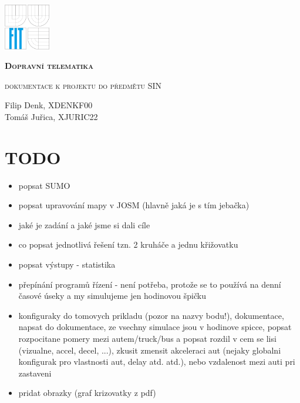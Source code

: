 \documentclass[a4paper,11pt]{article}
\begin{document}
\begin{titlepage}
	\centering
	\includegraphics[width=0.15\textwidth]{fig/fit-zp2.pdf}\par\vspace{7cm}
	{\scshape\LARGE\bfseries Dopravní telematika\par}
	\vspace{0.5cm}
	{\scshape\Large dokumentace k projektu do předmětu SIN \par}
	\vspace{1.5cm}
	{\huge\bfseries \par}
	\vspace{2cm}
	{\Large\itshape \par}
	\vspace{8cm}
	Filip Denk, XDENKF00
	\\Tomáš Juřica, XJURIC22
\end{titlepage}


\section{TODO}
\begin{itemize}
	\item popsat SUMO
	\item popsat upravování mapy v JOSM (hlavně jaká je s tím jebačka)
	\item jaké je zadání a jaké jsme si dali cíle
	\item co popsat jednotlivá řešení tzn. 2 kruháče a jednu křižovatku
	\item popsat výstupy - statistika
	\item přepínání programů řízení - není potřeba, protože se to používá na denní časové úseky a my simulujeme jen hodinovou špičku
	\item konfiguraky do tomovych prikladu (pozor na nazvy bodu!), dokumentace, napsat do dokumentace, ze vsechny simulace jsou v hodinove spicce, popsat rozpocitane pomery mezi autem/truck/bus a popsat rozdil v cem se lisi (vizualne, accel, decel, ...), zkusit zmensit akceleraci aut (nejaky globalni konfigurak pro vlastnosti aut, delay atd. atd.), nebo vzdalenost mezi auti pri zastaveni
	\item pridat obrazky (graf krizovatky z pdf)
\end{itemize}
\end{document}
